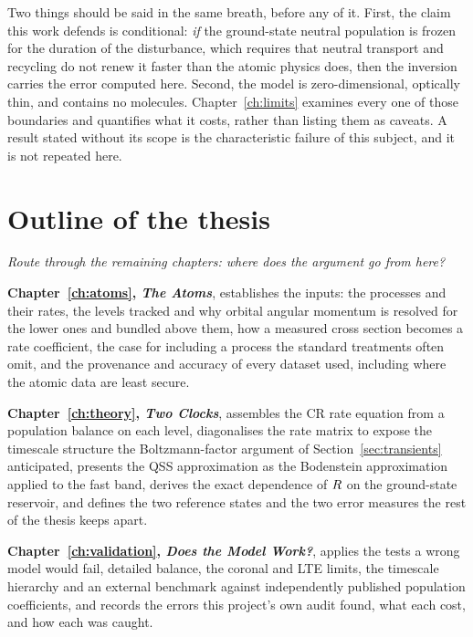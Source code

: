 Two things should be said in the same breath, before any of it. First, the claim
this work defends is conditional: \emph{if} the ground-state neutral population
is frozen for the duration of the disturbance, which requires that neutral
transport and recycling do not renew it faster than the atomic physics does, then
the inversion carries the error computed here. Second, the model is
zero-dimensional, optically thin, and contains no molecules.
Chapter~\ref{ch:limits} examines every one of those boundaries and quantifies
what it costs, rather than listing them as caveats. A result stated without its
scope is the characteristic failure of this subject, and it is not repeated here.

\section{Outline of the thesis}
\label{sec:outline}

\emph{Route through the remaining chapters: where does the argument go from here?}

\textbf{Chapter~\ref{ch:atoms}, \emph{The Atoms}}, establishes the inputs: the
processes and their rates, the levels tracked and why orbital angular momentum is
resolved for the lower ones and bundled above them, how a measured cross section
becomes a rate coefficient, the case for including a process the standard
treatments often omit, and the provenance and accuracy of every dataset used,
including where the atomic data are least secure.

\textbf{Chapter~\ref{ch:theory}, \emph{Two Clocks}}, assembles the CR rate
equation from a population balance on each level, diagonalises the rate matrix to
expose the timescale structure the Boltzmann-factor argument of
Section~\ref{sec:transients} anticipated, presents the QSS approximation as the
Bodenstein approximation applied to the fast band, derives the exact dependence
of $R$ on the ground-state reservoir, and defines the two reference states
and the two error measures the rest of the thesis keeps apart.

\textbf{Chapter~\ref{ch:validation}, \emph{Does the Model Work?}}, applies the
tests a wrong model would fail, detailed balance, the coronal and LTE limits, the
timescale hierarchy and an external benchmark against independently published
population coefficients, and records the errors this project's own audit found,
what each cost, and how each was caught.

